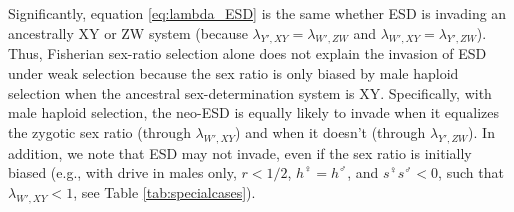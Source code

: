\documentclass[12pt]{article}
\begin{document}

Significantly, equation \eqref{eq:lambda_ESD} is the same whether ESD is invading an ancestrally XY or ZW system (because $\lambda_{Y',XY} = \lambda_{W',ZW}$ and $\lambda_{W',XY} = \lambda_{Y',ZW}$).
Thus, Fisherian sex-ratio selection alone does not explain the invasion of ESD under weak selection because the sex ratio is only biased by male haploid selection when the ancestral sex-determination system is XY. 
Specifically, with male haploid selection, the neo-ESD is equally likely to invade when it equalizes the zygotic sex ratio (through $\lambda_{W',XY}$) and when it doesn't (through $\lambda_{Y',ZW}$). 
In addition, we note that ESD may not invade, even if the sex ratio is initially biased (e.g., with drive in males only, $r<1/2$, $h^\female=h^\male$, and $s^\female s^\male<0$, such that $\lambda_{W',XY}<1$, see Table \ref{tab:specialcases}). 



\end{document}
